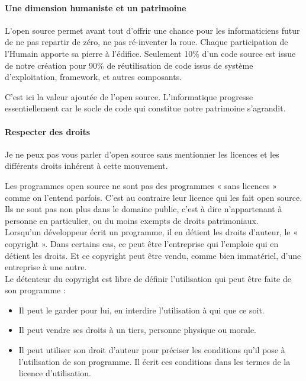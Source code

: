 				\paragraph{Une dimension humaniste et un patrimoine\\}

					L'open source permet avant tout d'offrir une chance pour les informaticiens futur de ne pas repartir de zéro, ne pas ré-inventer la roue. Chaque participation de l'Humain apporte sa pierre à l'édifice.
					Seulement 10\% d'un code source est issue de notre création pour 90\% de réutilisation de code issus de système d'exploitation, \gls{framework}, et autres composants.

					C'est ici la valeur ajoutée de l'open source. L'informatique progresse essentiellement car le socle de code qui constitue notre patrimoine s'agrandit.

				\paragraph{Respecter des droits\\}

					Je ne peux pas vous parler d'open source sans mentionner les licences et les différents droits inhérent à cette mouvement.

					Les programmes open source ne sont pas des programmes « sans licences » comme on l'entend parfois. C'est au contraire leur licence qui les fait open source. Ils ne sont pas non plus dans le domaine public, c'est à dire n'appartenant à personne en particulier, ou du moins exempts de droits patrimoniaux.\\

					Lorsqu'un développeur écrit un programme, il en détient les droits d'auteur, le « copyright ». Dans certains cas, ce peut être l'entreprise qui l'emploie qui en détient les droits. Et ce copyright peut être vendu, comme bien immatériel, d'une entreprise à une autre. \\

					Le détenteur du copyright est libre de définir l'utilisation qui peut être faite de son programme : 

					\begin{itemize}[label=\textbullet, font=\LARGE \color{burntorange}]
						\item Il peut le garder pour lui, en interdire l'utilisation à qui que ce soit.
						\item Il peut vendre ses droits à un tiers, personne physique ou morale.
						\item Il peut utiliser son droit d'auteur pour préciser les conditions qu'il pose à l'utilisation de son programme. Il écrit ces conditions dans les termes de la licence d'utilisation.
					\end{itemize}
				
